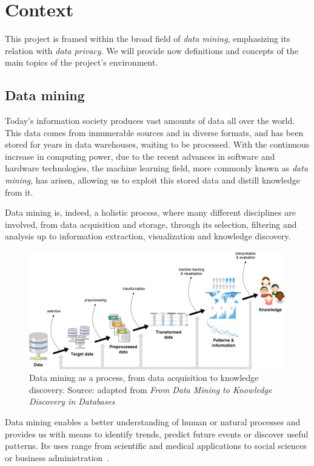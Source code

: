 \section{Context}
\label{section:context}

This project is framed within the broad field of \textit{data mining}, emphasizing its relation with \textit{data privacy}. We will provide now definitions and concepts of the main topics of the project’s environment.

\subsection{Data mining}

Today’s information society produces vast amounts of data all over the world. This data comes from innumerable sources and in diverse formats, and has been stored for years in data warehouses, waiting to be processed. With the continuous increase in computing power, due to the recent advances in software and hardware technologies, the machine learning field, more commonly known as \textit{data mining}, has arisen, allowing us to exploit this stored data and distill knowledge from it.

Data mining is, indeed, a holistic process, where many different disciplines are involved, from data acquisition and storage, through its selection, filtering and analysis up to information extraction, visualization and knowledge discovery.

\begin{figure}[h]
	\centering
	\includegraphics[width=0.9\linewidth]{figures/Untitled.png}
	\caption{Data mining as a process, from data acquisition to knowledge discovery. Source: adapted from \textit{From Data Mining to Knowledge Discovery in Databases}~\cite{Fayyad:1996:DMK:257938.257942}}
	\label{fig:data-mining}
\end{figure}

Data mining enables a better understanding of human or natural processes and provides us with means to identify trends, predict future events or discover useful patterns. Its uses range from scientific and medical applications to social sciences or business administration~\cite{Fayyad:1996:DMK:257938.257942}.

